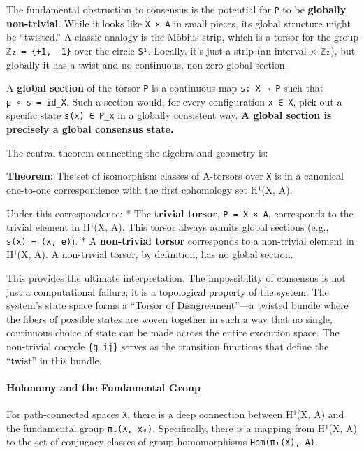 \documentclass[
]{article}
\begin{document}
The fundamental obstruction to consensus is the potential for \texttt{P}
to be \textbf{globally non-trivial}. While it looks like
\texttt{X\ ×\ A} in small pieces, its global structure might be
``twisted.'' A classic analogy is the Möbius strip, which is a torsor
for the group \texttt{ℤ₂\ =\ \{+1,\ -1\}} over the circle \texttt{S¹}.
Locally, it's just a strip (an interval × \texttt{ℤ₂}), but globally it
has a twist and no continuous, non-zero global section.

A \textbf{global section} of the torsor \texttt{P} is a continuous map
\texttt{s:\ X\ →\ P} such that \texttt{p\ ∘\ s\ =\ id\_X}. Such a
section would, for every configuration \texttt{x\ ∈\ X}, pick out a
specific state \texttt{s(x)\ ∈\ P\_x} in a globally consistent way.
\textbf{A global section is precisely a global consensus state.}

The central theorem connecting the algebra and geometry is:

\textbf{Theorem:} The set of isomorphism classes of A-torsors over
\texttt{X} is in a canonical one-to-one correspondence with the first
cohomology set H¹(X, A).

Under this correspondence: * The \textbf{trivial torsor},
\texttt{P\ =\ X\ ×\ A}, corresponds to the trivial element in H¹(X, A).
This torsor always admits global sections (e.g.,
\texttt{s(x)\ =\ (x,\ e)}). * A \textbf{non-trivial torsor} corresponds
to a non-trivial element in H¹(X, A). A non-trivial torsor, by
definition, has no global section.

This provides the ultimate interpretation. The impossibility of
consensus is not just a computational failure; it is a topological
property of the system. The system's state space forms a ``Torsor of
Disagreement''---a twisted bundle where the fibers of possible states
are woven together in such a way that no single, continuous choice of
state can be made across the entire execution space. The non-trivial
cocycle \texttt{\{g\_ij\}} serves as the transition functions that
define the ``twist'' in this bundle.

\paragraph{Holonomy and the Fundamental
Group}\label{holonomy-and-the-fundamental-group}

For path-connected spaces \texttt{X}, there is a deep connection between
H¹(X, A) and the fundamental group \texttt{π₁(X,\ x₀)}. Specifically,
there is a mapping from H¹(X, A) to the set of conjugacy classes of
group homomorphisms \texttt{Hom(π₁(X),\ A)}.
\end{document}
